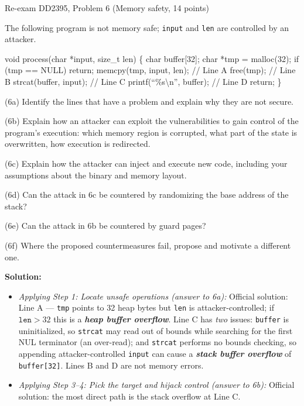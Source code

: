 \documentclass[12pt, a4paper]{article}
\newcommand{\term}[1]{\textbf{\textit{#1}}}        %
\begin{document}
\begin{practicebox}{Re-exam DD2395, Problem 6 (Memory safety, 14 points)}
\begin{problembox}
The following program is not memory safe; \texttt{input} and \texttt{len} are controlled by an attacker. 
\begin{codebox}
void process(char *input, size\_t len) \{ char buffer[32];
char *tmp = malloc(32);
if (tmp == NULL) return;
memcpy(tmp, input, len);
// Line A free(tmp);
// Line B strcat(buffer, input);
// Line C printf(``\%s\textbackslash n'', buffer);
// Line D return;
\}
\end{codebox}

(6a) Identify the lines that have a problem and explain why they are not secure.

(6b) Explain how an attacker can exploit the vulnerabilities to gain control of the program's execution: which memory region is corrupted, what part of the state is overwritten, how execution is redirected.

(6c) Explain how the attacker can inject and execute new code, including your assumptions about the binary and memory layout.

(6d) Can the attack in 6c be countered by randomizing the base address of the stack?

(6e) Can the attack in 6b be countered by guard pages?

(6f) Where the proposed countermeasures fail, propose and motivate a different one.
\end{problembox}

\textbf{Solution:}
\begin{itemize}
    \item \textit{Applying Step 1: Locate unsafe operations (answer to 6a):} Official solution: Line A --- \texttt{tmp} points to 32 heap bytes but \texttt{len} is attacker-controlled; if $\texttt{len} > 32$ this is a \term{heap buffer overflow}.
    Line C has \emph{two} issues: \texttt{buffer} is uninitialized, so \texttt{strcat} may read out of bounds while searching for the first NUL terminator (an over-read); and \texttt{strcat} performs no bounds checking, so appending attacker-controlled \texttt{input} can cause a \term{stack buffer overflow} of \texttt{buffer[32]}. Lines B and D are not memory errors.
    \item \textit{Applying Step 3--4: Pick the target and hijack control (answer to 6b):} Official solution: the most direct path is the stack overflow at Line C.


\end{itemize}
\end{practicebox}
\end{document}
